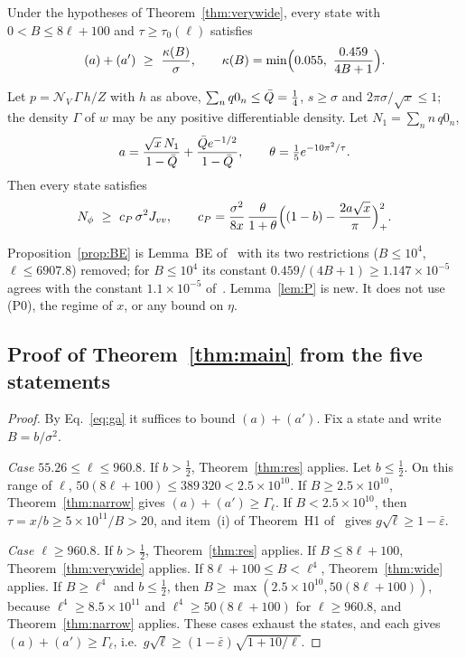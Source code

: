 \begin{proposition} \proofst
\label{prop:BE}
Under the hypotheses of Theorem~\ref{thm:verywide}, every state with $0<B\le8\ell+100$ and $\tau\ge\tau_0(\ell)$ satisfies
\begin{equation}
(a)+(a')\ \ge\ \frac{\kappa(B)}{\sigma},\qquad \kappa(B)=\min\Bigl(0.055,\ \frac{0.459}{4B+1}\Bigr).
\end{equation}
\end{proposition}

\begin{lemma} \proofst
\label{lem:P}
Let $p=\mathcal N_V\,\Gamma\,h/Z$ with $h$ as above, $\sum_nq0_n\le\bar Q=\tfrac14$, $s\ge\sigma$ and $2\pi\sigma/\sqrt x\le1$; the density $\Gamma$ of $w$ may be any positive differentiable density.
Let $N_1=\sum_nn\,q0_n$,
\begin{equation}
a=\frac{\sqrt x\,N_1}{1-\bar Q}+\frac{\bar Q e^{-1/2}}{1-\bar Q},\qquad \theta=\tfrac15e^{-10\pi^2/\tau}.
\end{equation}
Then every state satisfies
\begin{equation}
N_\phi\ \ge\ c_P\,\sigma^2\Jvv,\qquad c_P=\frac{\sigma^2}{8x}\,\frac{\theta}{1+\theta}\Bigl((1-b)-\frac{2a\sqrt x}{\pi}\Bigr)_+^2 .
\end{equation}
\end{lemma}

Proposition~\ref{prop:BE} is Lemma~BE of~\cite{H} with its two restrictions ($B\le10^4$, $\ell\le6907.8$) removed; for $B\le10^4$ its constant $0.459/(4B+1)\ge1.147\times10^{-5}$ agrees with the constant $1.1\times10^{-5}$ of~\cite{H}.
Lemma~\ref{lem:P} is new.
It does not use (P0), the regime of $x$, or any bound on $\eta$.

\subsection{Proof of Theorem~\ref{thm:main} from the five statements}

\begin{proof}
By Eq.~\eqref{eq:ga} it suffices to bound $(a)+(a')$.
Fix a state and write $B=b/\sigma^2$.

\emph{Case $55.26\le\ell\le960.8$.}
If $b>\tfrac12$, Theorem~\ref{thm:res} applies.
Let $b\le\tfrac12$.
On this range of $\ell$, $50(8\ell+100)\le389\,320<2.5\times10^{10}$.
If $B\ge2.5\times10^{10}$, Theorem~\ref{thm:narrow} gives $(a)+(a')\ge\Gamma_\ell$.
If $B<2.5\times10^{10}$, then $\tau=x/b\ge5\times10^{11}/B>20$, and item~(i) of Theorem~H1 of~\cite{H} gives $g\sqrt\ell\ge1-\bar\varepsilon$.

\emph{Case $\ell\ge960.8$.}
If $b>\tfrac12$, Theorem~\ref{thm:res} applies.
If $B\le8\ell+100$, Theorem~\ref{thm:verywide} applies.
If $8\ell+100\le B<\ell^4$, Theorem~\ref{thm:wide} applies.
If $B\ge\ell^4$ and $b\le\tfrac12$, then $B\ge\max(2.5\times10^{10},50(8\ell+100))$, because $\ell^4\ge8.5\times10^{11}$ and $\ell^4\ge50(8\ell+100)$ for $\ell\ge960.8$, and Theorem~\ref{thm:narrow} applies.
These cases exhaust the states, and each gives $(a)+(a')\ge\Gamma_\ell$, i.e.\ $g\sqrt\ell\ge(1-\bar\varepsilon)\sqrt{1+10/\ell}$.
\end{proof}

